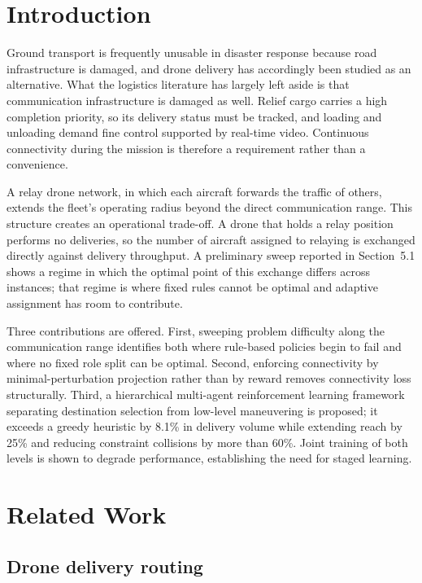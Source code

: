 \documentclass[12pt]{article}
\begin{document}
\section{Introduction}

Ground transport is frequently unusable in disaster response because road infrastructure is
damaged, and drone delivery has accordingly been studied as an alternative. What the logistics
literature has largely left aside is that communication infrastructure is damaged as well.
Relief cargo carries a high completion priority, so its delivery status must be tracked, and
loading and unloading demand fine control supported by real-time video. Continuous connectivity
during the mission is therefore a requirement rather than a convenience.

A relay drone network, in which each aircraft forwards the traffic of others, extends the fleet's
operating radius beyond the direct communication range. This structure creates an operational
trade-off. A drone that holds a relay position performs no deliveries, so the number of aircraft
assigned to relaying is exchanged directly against delivery throughput. A preliminary sweep
reported in Section~5.1 shows a regime in which the optimal point of this exchange differs across
instances; that regime is where fixed rules cannot be optimal and adaptive assignment has room to
contribute.

Three contributions are offered. First, sweeping problem difficulty along the communication range
identifies both where rule-based policies begin to fail and where no fixed role split can be
optimal. Second, enforcing connectivity by minimal-perturbation projection rather than by reward
removes connectivity loss structurally. Third, a hierarchical multi-agent reinforcement learning
framework separating destination selection from low-level maneuvering is proposed; it exceeds a
greedy heuristic by 8.1\% in delivery volume while extending reach by 25\% and reducing constraint
collisions by more than 60\%. Joint training of both levels is shown to degrade performance,
establishing the need for staged learning.

\section{Related Work}

\subsection{Drone delivery routing}
\end{document}
